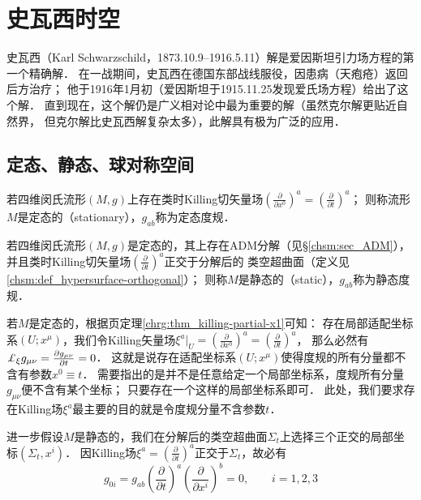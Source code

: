 
%
\chapter{史瓦西时空}\label{chsch}

史瓦西（Karl Schwarzschild，1873.10.9--1916.5.11）解是爱因斯坦引力场方程的第一个精确解．
在一战期间，史瓦西在德国东部战线服役，因患病（天疱疮）返回后方治疗；
他于1916年1月初（爱因斯坦于1915.11.25发现爱氏场方程）给出了这个解．
直到现在，这个解仍是广义相对论中最为重要的解（虽然克尔解更贴近自然界，
但克尔解比史瓦西解复杂太多），此解具有极为广泛的应用．



\section{定态、静态、球对称空间}

\begin{definition}\label{chsch:def_stationary}
    若四维闵氏流形$(M,g)$上存在类时Killing切矢量场$(\frac{\partial }{\partial x^0} )^a
    =(\frac{\partial }{\partial t} )^a$；
    则称流形$M$是{\heiti 定态的}（stationary），$g_{ab}$称为定态度规．
\end{definition}

\begin{definition}\label{chsch:def_static}
    若四维闵氏流形$(M,g)$是定态的，其上存在ADM分解（见\S\ref{chsm:sec_ADM}），
    并且类时Killing切矢量场$(\frac{\partial }{\partial t} )^a$正交于分解后的
    类空超曲面（定义见\ref{chsm:def_hypersurface-orthogonal}）；
    则称$M$是{\heiti 静态的}（static），$g_{ab}$称为静态度规．
\end{definition}


若$M$是定态的，根据\pageref{chrg:thm_killing-partial-x1}页定理\ref{chrg:thm_killing-partial-x1}可知：
存在局部适配坐标系$(U;x^\mu)$，我们令Killing矢量场$\xi^a |_U = (\frac{\partial }{\partial x^0} )^a
=(\frac{\partial }{\partial t} )^a$，
那么必然有$\Lie_{\xi} g_{\mu\nu}= \frac{\partial g_{\mu\nu}}{\partial t}=0$．
这就是说存在适配坐标系$(U;x^\mu)$使得度规的所有分量都不含有参数$x^0\equiv t$．
需要指出的是并不是任意给定一个局部坐标系，度规所有分量$g_{\mu\nu}$便不含有某个坐标；
只要存在一个这样的局部坐标系即可．
此处，我们要求存在Killing场$\xi^a$最主要的目的就是令度规分量不含参数$t$．


进一步假设$M$是静态的，我们在分解后的类空超曲面$\Sigma_t$上选择三个正交的局部坐标$(\Sigma_t, x^i)$．
因Killing场$\xi^a =(\frac{\partial }{\partial t} )^a$正交于$\Sigma_t$，故必有
\begin{equation}
    g_{0i} = g_{ab}\left(\frac{\partial }{\partial t} \right)^a 
    \left(\frac{\partial }{\partial x^i} \right)^b    =0, \qquad i=1,2,3
\end{equation}

